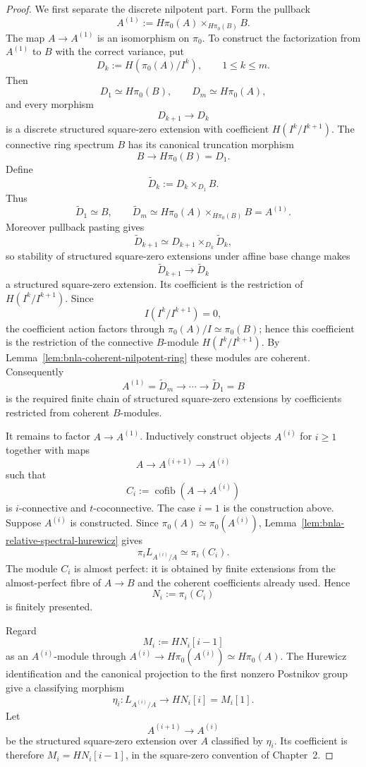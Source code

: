 \begin{proof}
We first separate the discrete nilpotent part.  Form the pullback
\[
    A^{(1)}:=H\pi_0(A)\times_{H\pi_0(B)}B.
\]
The map $A\to A^{(1)}$ is an isomorphism on $\pi_0$.  To construct the
factorization from $A^{(1)}$ to $B$ with the correct variance, put
\[
    D_k:=H\!\left(\pi_0(A)/I^k\right),
    \qquad
    1\leq k\leq m.
\]
Then
\[
    D_1\simeq H\pi_0(B),
    \qquad
    D_m\simeq H\pi_0(A),
\]
and every morphism
\[
    D_{k+1}\longrightarrow D_k
\]
is a discrete structured square-zero extension with coefficient
$H(I^k/I^{k+1})$.  The connective ring spectrum $B$ has its canonical
truncation morphism
\[
    B\longrightarrow H\pi_0(B)=D_1.
\]
Define
\[
    \widetilde D_k
    :=
    D_k\times_{D_1}B.
\]
Thus
\[
    \widetilde D_1\simeq B,
    \qquad
    \widetilde D_m
    \simeq
    H\pi_0(A)\times_{H\pi_0(B)}B
    =A^{(1)}.
\]
Moreover pullback pasting gives
\[
    \widetilde D_{k+1}
    \simeq
    D_{k+1}\times_{D_k}\widetilde D_k,
\]
so stability of structured square-zero extensions under affine base change
makes
\[
    \widetilde D_{k+1}\longrightarrow\widetilde D_k
\]
a structured square-zero extension.  Its coefficient is the restriction of
$H(I^k/I^{k+1})$.  Since
\[
    I(I^k/I^{k+1})=0,
\]
the coefficient action factors through
$\pi_0(A)/I\simeq\pi_0(B)$; hence this coefficient is the restriction of
the connective $B$-module $H(I^k/I^{k+1})$.  By
Lemma~\ref{lem:bnla-coherent-nilpotent-ring} these modules are coherent.
Consequently
\[
    A^{(1)}=\widetilde D_m
    \longrightarrow\cdots\longrightarrow
    \widetilde D_1=B
\]
is the required finite chain of structured square-zero extensions by
coefficients restricted from coherent $B$-modules.

It remains to factor $A\to A^{(1)}$.  Inductively construct objects
$A^{(i)}$ for $i\geq1$ together with maps
\[
    A\longrightarrow A^{(i+1)}
    \longrightarrow A^{(i)}
\]
such that
\[
    C_i:=\operatorname{cofib}(A\to A^{(i)})
\]
is $i$-connective and $t$-coconnective.  The case $i=1$ is the construction
above.  Suppose $A^{(i)}$ is constructed.  Since
$\pi_0(A)\simeq\pi_0(A^{(i)})$,
Lemma~\ref{lem:bnla-relative-spectral-hurewicz} gives
\[
    \pi_iL_{A^{(i)}/A}
    \simeq
    \pi_i(C_i).
\]
The module $C_i$ is almost perfect: it is obtained by finite extensions from
the almost-perfect fibre of $A\to B$ and the coherent coefficients already
used.  Hence
\[
    N_i:=\pi_i(C_i)
\]
is finitely presented.

Regard
\[
    M_i:=HN_i[i-1]
\]
as an $A^{(i)}$-module through
$A^{(i)}\to H\pi_0(A^{(i)})\simeq H\pi_0(A)$.  The Hurewicz identification
and the canonical projection to the first nonzero Postnikov group give a
classifying morphism
\[
    \eta_i:
    L_{A^{(i)}/A}
    \longrightarrow
    HN_i[i]
    =
    M_i[1].
\]
Let
\[
    A^{(i+1)}\longrightarrow A^{(i)}
\]
be the structured square-zero extension over $A$ classified by $\eta_i$.
Its coefficient is therefore $M_i=HN_i[i-1]$, in the square-zero convention
of Chapter~2.


\end{proof}
